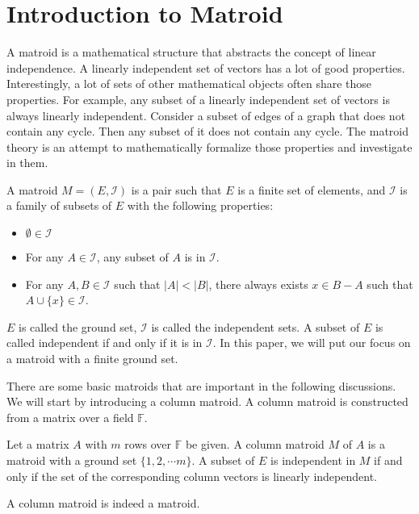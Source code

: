\section{Introduction to Matroid}

A matroid is a mathematical structure that abstracts the concept of linear independence.
A linearly independent set of vectors has a lot of good properties.
Interestingly, a lot of sets of other mathematical objects often share those properties.
For example, any subset of a linearly independent set of vectors is always linearly independent.
Consider a subset of edges of a graph that does not contain any cycle.
Then any subset of it does not contain any cycle.
The matroid theory is an attempt to mathematically formalize those properties and investigate in them.

\begin{defn}
A matroid $M = (E, \mathcal{I})$ is a pair such that $E$ is a finite set of elements, and $\mathcal{I}$ is a family of subsets of $E$ with the following properties:
\begin{itemize}
\item $\emptyset \in \mathcal{I}$
\item For any $A\in \mathcal{I}$, any subset of $A$ is in $\mathcal{I}$.
\item For any $A, B \in \mathcal{I}$ such that $\lvert A \rvert < \lvert B \rvert$, there always exists $x \in B - A$ such that $A \cup \{ x \} \in \mathcal{I}$.
\end{itemize}
\end{defn}
$E$ is called the ground set, $\mathcal{I}$ is called the independent sets. A subset of $E$ is called independent if and only if it is in $\mathcal{I}$.
In this paper, we will put our focus on a matroid with a finite ground set. 


There are some basic matroids that are important in the following discussions.
We will start by introducing a column matroid. 
A column matroid is constructed from a matrix over a field $\mathbb{F}$.

\begin{defn}
Let a matrix $A$ with $m$ rows over $\mathbb{F}$ be given.
A column matroid $M$ of $A$ is a matroid with a ground set $\{ 1, 2, \cdots m \}$.
A subset of $E$ is independent in $M$ if and only if the set of the corresponding column vectors is linearly independent.
\end{defn}

\begin{thm}
A column matroid is indeed a matroid.
\end{thm}

